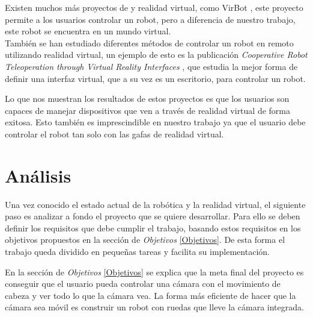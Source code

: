 \documentclass[twoside, 11pt]{epstfg}
\begin{document}
Existen muchos más proyectos de y realidad virtual, como VirBot \cite{savage1998virbot}, este proyecto permite a los usuarios controlar un robot, pero a diferencia de nuestro trabajo, este robot se encuentra en un mundo virtual.\\También se han estudiado diferentes métodos de controlar un robot en remoto utilizando realidad virtual, un ejemplo de esto es la publicación \textit{Cooperative Robot Teleoperation through Virtual Reality Interfaces} \cite{monferrer2002cooperative}, que estudia la mejor forma de definir una interfaz virtual, que a su vez es un escritorio, para controlar un robot.

Lo que nos muestran los resultados de estos proyectos es que los usuarios son capaces de manejar dispositivos que ven a través de realidad virtual de forma exitosa. Esto también es imprescindible en nuestro trabajo ya que el usuario debe controlar el robot tan solo con las gafas de realidad virtual.






\chapter{Análisis}
\label{chap:sistemadesarrollado}
Una vez conocido el estado actual de la robótica y la realidad virtual, el siguiente paso es analizar a fondo el proyecto que se quiere desarrollar.
Para ello se deben definir los requisitos que debe cumplir el trabajo, basando estos requisitos en los objetivos propuestos en la sección de \textit{Objetivos} \ref{Objetivos}. De esta forma el trabajo queda dividido en pequeñas tareas y facilita su implementación.

En la sección de \textit{Objetivos} \ref{Objetivos} se explica que la meta final del proyecto es conseguir que el usuario pueda controlar una cámara con el movimiento de cabeza y ver todo lo que la cámara vea.
La forma más eficiente de hacer que la cámara sea móvil es construir un robot con ruedas que lleve la cámara integrada. 
\end{document}
